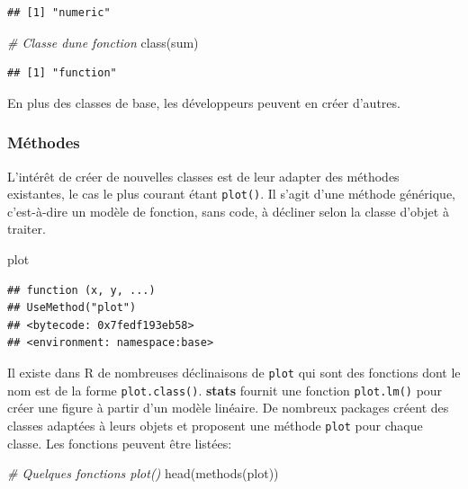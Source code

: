 \documentclass[
  11pt,
  french,
  a4paper,
  extrafontsizes,onecolumn,openright
  ]{memoir}
\newenvironment{Shaded}{\begin{snugshade}}{\end{snugshade}}
\newcommand{\CommentTok}[1]{\textcolor[rgb]{0.56,0.35,0.01}{\textit{#1}}}
\newcommand{\FunctionTok}[1]{\textcolor[rgb]{0.00,0.00,0.00}{#1}}
\newcommand{\NormalTok}[1]{#1}
\begin{document}
\begin{verbatim}
## [1] "numeric"
\end{verbatim}

\begin{Shaded}
\begin{Highlighting}[]
\CommentTok{\# Classe d\textquotesingle{}une fonction}
\FunctionTok{class}\NormalTok{(sum)}
\end{Highlighting}
\end{Shaded}

\begin{verbatim}
## [1] "function"
\end{verbatim}

\normalsize

En plus des classes de base, les développeurs peuvent en créer d'autres.

\hypertarget{muxe9thodes}{%
\subsubsection{Méthodes}\label{muxe9thodes}}

L'intérêt de créer de nouvelles classes est de leur adapter des méthodes existantes, le cas le plus courant étant \texttt{plot()}.
Il s'agit d'une méthode générique, c'est-à-dire un modèle de fonction, sans code, à décliner selon la classe d'objet à traiter.

\scriptsize

\begin{Shaded}
\begin{Highlighting}[]
\NormalTok{plot}
\end{Highlighting}
\end{Shaded}

\begin{verbatim}
## function (x, y, ...) 
## UseMethod("plot")
## <bytecode: 0x7fedf193eb58>
## <environment: namespace:base>
\end{verbatim}

\normalsize

Il existe dans R de nombreuses déclinaisons de \texttt{plot} qui sont des fonctions dont le nom est de la forme \texttt{plot.class()}.
\textbf{stats} fournit une fonction \texttt{plot.lm()} pour créer une figure à partir d'un modèle linéaire.
De nombreux packages créent des classes adaptées à leurs objets et proposent une méthode \texttt{plot} pour chaque classe.
Les fonctions peuvent être listées:

\scriptsize

\begin{Shaded}
\begin{Highlighting}[]
\CommentTok{\# Quelques fonctions plot()}
\FunctionTok{head}\NormalTok{(}\FunctionTok{methods}\NormalTok{(plot))}
\end{Highlighting}
\end{Shaded}
\end{document}
